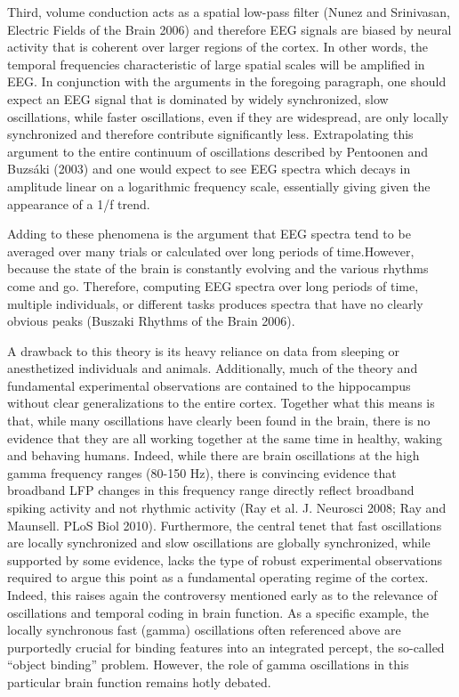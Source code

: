 Third, volume conduction acts as a spatial low-pass filter (Nunez and Srinivasan, Electric Fields of the Brain 2006) and therefore EEG signals are biased by neural activity that is coherent over larger regions of the cortex. In other words, the temporal frequencies characteristic of large spatial scales will be amplified in EEG. In conjunction with the arguments in the foregoing paragraph, one should expect an EEG signal that is dominated by widely synchronized, slow oscillations, while faster oscillations, even if they are widespread, are only locally synchronized and therefore contribute significantly less. Extrapolating this argument to the entire continuum of oscillations described by Pentoonen and Buzsáki (2003) and one would expect to see EEG spectra which decays in amplitude linear on a logarithmic frequency scale, essentially giving given the appearance of a 1/f trend.

Adding to these phenomena is the argument that EEG spectra tend to be averaged over many trials or calculated over long periods of time.However, because the state of the brain is constantly evolving and the various rhythms come and go. Therefore, computing EEG spectra over long periods of time, multiple individuals, or different tasks produces spectra that have no clearly obvious peaks (Buszaki Rhythms of the Brain 2006).

A drawback to this theory is its heavy reliance on data from sleeping or anesthetized individuals and animals. Additionally, much of the theory and fundamental experimental observations are contained to the hippocampus without clear generalizations to the entire cortex. Together what this means is that, while many oscillations have clearly been found in the brain, there is no evidence that they are all working together at the same time in healthy, waking and behaving humans. Indeed, while there are brain oscillations at the high gamma frequency ranges (80-150 Hz), there is convincing evidence that broadband LFP changes in this frequency range directly reflect broadband spiking activity and not rhythmic activity (Ray et al. J. Neurosci 2008; Ray and Maunsell. PLoS Biol 2010). Furthermore, the central tenet that fast oscillations are locally synchronized and slow oscillations are globally synchronized, while supported by some evidence, lacks the type of robust experimental observations required to argue this point as a fundamental operating regime of the cortex. Indeed, this raises again the controversy mentioned early as to the relevance of oscillations and temporal coding in brain function. As a specific example, the locally synchronous fast (gamma) oscillations often referenced above are purportedly crucial for binding features into an integrated percept, the so-called “object binding” problem. However, the role of gamma oscillations in this particular brain function remains hotly debated. 

